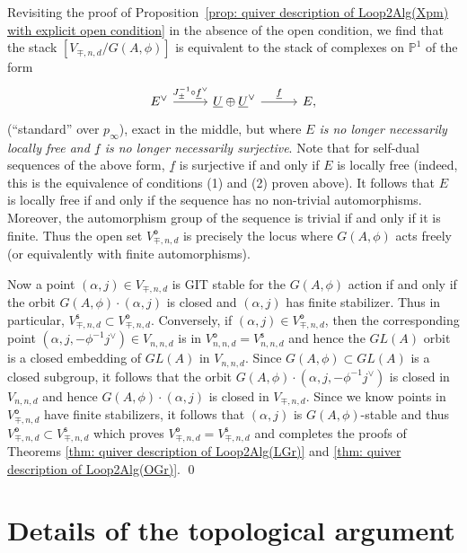 \documentclass{amsart}
\theoremstyle{definition}
\newcommand{\PP}{\mathbb{P}}
\newcommand{\UL}[1]{\underline{#1}}
\newcommand{\open}{\mathsf{o}}
\newcommand{\stable}{\mathsf{s}}
\begin{document}
Revisiting the proof of Proposition~\ref{prop: quiver description of
Loop2Alg(Xpm) with explicit open condition} in the absence of the open
condition, we find that the stack $[V_{\mp ,n,d} / G(A,\phi )]$ is
equivalent to the stack of complexes on $\PP^{1}$ of the form
\[
\begin{tikzcd}[column sep={6em,between origins}]
E^{\vee } \arrow[r, "J_{\pm }^{-1}\circ \UL{f}^{\vee}"] &
\UL{U}\oplus \UL{U}^{\vee } \arrow[r, "\UL{f}"] & E,
\end{tikzcd}
\]
(``standard'' over $p_{\infty}$), exact in the middle, but where {\em $E$ is no
longer necessarily locally free and $\UL{f}$ is no longer necessarily
surjective}. Note that for self-dual sequences of the above form,
$\UL{f}$ is surjective if and only if $E$ is locally free (indeed,
this is the equivalence of conditions (1) and (2) proven above). It
follows that $E$ is locally free if and only if the sequence has no
non-trivial automorphisms. Moreover, the automorphism group of the
sequence is trivial if and only if it is finite. Thus the open set
$V^{\open}_{\mp ,n,d}$ is precisely the locus where $G(A,\phi )$ acts
freely (or equivalently with finite automorphisms).

Now a point $(\alpha ,j)\in V_{\mp ,n,d}$ is GIT stable for the
$G(A,\phi )$ action if and only if the orbit $G(A,\phi )\cdot (\alpha
,j)$ is closed and $(\alpha ,j)$ has finite stabilizer. Thus in
particular, $V^{\stable}_{\mp ,n,d}\subset V^{\open}_{\mp
,n,d}$. Conversely, if $(\alpha ,j)\in V^{\open}_{\mp ,n,d}$, then the
corresponding point $(\alpha ,j,-\phi^{-1}j^{\vee})\in V_{n,n,d}$ is
in $V^{\open}_{n,n,d}=V^{\stable}_{n,n,d}$ and hence the $GL(A)$ orbit
is a closed embedding of $GL(A)$ in $V_{n,n,d}$. Since $G(A,\phi
)\subset GL(A)$ is a closed subgroup, it follows that the orbit
$G(A,\phi )\cdot (\alpha ,j,-\phi^{-1}j^{\vee})$ is closed in
$V_{n,n,d}$ and hence $G(A,\phi )\cdot (\alpha ,j)$ is closed in
$V_{\mp ,n,d}$. Since we know points in $V^{\open}_{\mp ,n,d}$ have
finite stabilizers, it follows that $(\alpha ,j)$ is $G(A,\phi )$-stable and thus $V^{\open}_{\mp ,n,d}\subset V^{\stable }_{\mp ,n,d}$
which proves $V^{\open}_{\mp ,n,d}=V^{\stable }_{\mp ,n,d}$ and
completes the proofs of Theorems \ref{thm: quiver description of
Loop2Alg(LGr)} and \ref{thm: quiver description of
Loop2Alg(OGr)}. \qed

\section{Details of the topological argument}\label{sec: topological details}
\end{document}
